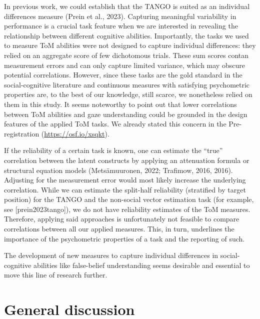\documentclass[
  man,mask,floatsintext]{apa6}
\begin{document}
In previous work, we could establish that the TANGO is suited as an individual differences measure (Prein et al., 2023). Capturing meaningful variability in performance is a crucial task feature when we are interested in revealing the relationship between different cognitive abilities. Importantly, the tasks we used to measure ToM abilities were not designed to capture individual differences: they relied on an aggregate score of few dichotomous trials. These sum scores contan measurement errors and can only capture limited variance, which may obscure potential correlations. However, since these tasks are the gold standard in the social-cognitive literature and continuous measures with satisfying psychometric properties are, to the best of our knowledge, still scarce, we nonetheless relied on them in this study. It seems noteworthy to point out that lower correlations between ToM abilities and gaze understanding could be grounded in the design features of the applied ToM tasks. We already stated this concern in the Pre-registration (\url{https://osf.io/xsqkt}).

If the reliability of a certain task is known, one can estimate the ``true'' correlation between the latent constructs by applying an attenuation formula or structural equation models (Metsämuuronen, 2022; Trafimow, 2016, 2016). Adjusting for the measurement error would most likely increase the underlying correlation. While we can estimate the split-half reliability (stratified by target position) for the TANGO and the non-social vector estimation task (for example, see {[}prein2023tango{]}), we do not have reliability estimates of the ToM measures. Therefore, applying said approaches is unfortunately not feasible to compare correlations between all our applied measures. This, in turn, underlines the importance of the psychometric properties of a task and the reporting of such.

The development of new measures to capture individual differences in social-cognitive abilities like false-belief understanding seems desirable and essential to move this line of research further.

\hypertarget{general-discussion}{%
\section{General discussion}\label{general-discussion}}
\end{document}
